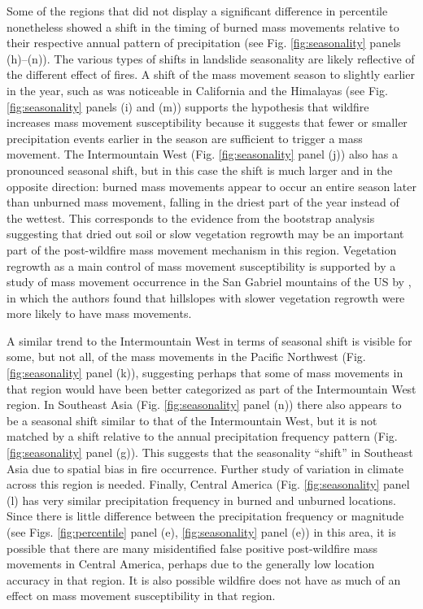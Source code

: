 \documentclass[nhess, manuscript]{copernicus}
\begin{document}
Some of the regions that did not display a significant difference in
percentile nonetheless showed a shift in the timing of burned mass movements
relative to their respective annual pattern of precipitation (see
Fig. \ref{fig:seasonality} panels (h)--(n)). The various types of shifts in
landslide seasonality are likely reflective of the different effect of
fires. A shift of the mass movement season to slightly earlier in the year,
such as was noticeable in California and the Himalayas (see
Fig. \ref{fig:seasonality} panels (i) and (m)) supports the hypothesis that
wildfire increases mass movement susceptibility because it suggests that fewer or 
smaller precipitation events earlier in the season are sufficient to trigger a 
mass movement. The Intermountain West
(Fig. \ref{fig:seasonality} panel (j)) also has a pronounced seasonal
shift, but in this case the shift is much larger and in the opposite
direction: burned mass movements appear to occur an entire season later than
unburned mass movement, falling in the driest part of the year instead of
the wettest. This corresponds to the evidence from the bootstrap
analysis suggesting that dried out soil or slow vegetation regrowth may
be an important part of the post-wildfire mass movement mechanism in this
region. Vegetation regrowth as a main control of mass movement susceptibility
is supported by a study of mass movement occurrence in the San Gabriel
mountains of the US by \citet{rengersLandslidesWildfireInitiation2020}, in which the authors found that hillslopes
with slower vegetation regrowth were more likely to have mass movements.

A similar trend to the Intermountain West in terms of seasonal shift is
visible for some, but not all, of the mass movements in the Pacific
Northwest (Fig. \ref{fig:seasonality} panel (k)), suggesting perhaps that
some of mass movements in that region would have been better categorized as
part of the Intermountain West region. In Southeast Asia
(Fig. \ref{fig:seasonality} panel (n)) there also appears to be a seasonal
shift similar to that of the Intermountain West, but it is not matched
by a shift relative to the annual precipitation frequency pattern
(Fig. \ref{fig:seasonality} panel (g)). This suggests that the seasonality
``shift'' in Southeast Asia due to spatial bias in fire occurrence. Further study of variation in climate across this region is needed. Finally, Central
America (Fig. \ref{fig:seasonality} panel (l) has very similar precipitation
frequency in burned and unburned locations. Since there is little
difference between the precipitation frequency or magnitude (see
Figs. \ref{fig:percentile} panel (e), \ref{fig:seasonality} panel (e)) in this area,
it is possible that there are many misidentified false positive
post-wildfire mass movements in Central America, perhaps due to the generally low location accuracy in that region. It is also possible
wildfire does not have as much of an effect on mass movement susceptibility
in that region.
\end{document}
